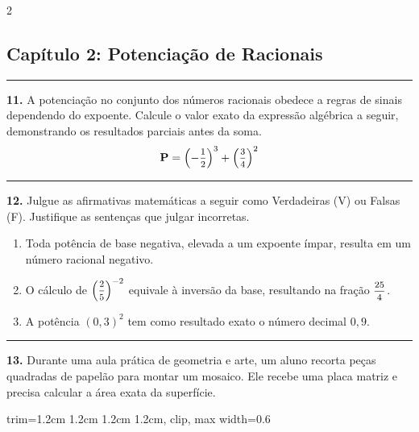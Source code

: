 \documentclass[twoside, 10pt, a4paper]{article}
\newlength{\espacoPosTitulo}\setlength{\espacoPosTitulo}{0.3cm}
\newlength{\espacoPreQuestao}\setlength{\espacoPreQuestao}{0.1cm}
\newlength{\espacoQuestao}\setlength{\espacoQuestao}{0.2cm}
\newcommand{\larguraTikz}{0.85\linewidth}
\begin{document}
\begin{multicols*}{2}
\subsection*{Capítulo 2: Potenciação de Racionais}
\vspace{-0.2cm}\noindent\rule{\linewidth}{1.5pt} 
\par\vspace{\espacoPosTitulo}
\textbf{11.} A potenciação no conjunto dos números racionais obedece a regras de sinais dependendo do expoente. Calcule o valor exato da expressão algébrica a seguir, demonstrando os resultados parciais antes da soma.
$$ \textbf{P} = \left( -\mfrac{1}{2} \right)^{3} + \left( \mfrac{3}{4} \right)^{2} $$
\par\vspace{\espacoQuestao}

\noindent\textcolor{CorLinha}{\rule{\linewidth}{0.5pt}} 
\par\vspace{\espacoPreQuestao}
\textbf{12.} Julgue as afirmativas matemáticas a seguir como Verdadeiras (V) ou Falsas (F). Justifique as sentenças que julgar incorretas.
\begin{enumerate}[label=\Roman*.]
    \item Toda potência de base negativa, elevada a um expoente ímpar, resulta em um número racional negativo.
    \item O cálculo de $ \left( \mfrac{2}{5} \right)^{-2} $ equivale à inversão da base, resultando na fração $ \mfrac{25}{4} $.
    \item A potência $ \left( 0,3 \right)^{2} $ tem como resultado exato o número decimal $ 0,9 $.
\end{enumerate}
\par\vspace{\espacoQuestao}

\noindent\textcolor{CorLinha}{\rule{\linewidth}{0.5pt}} 
\par\vspace{\espacoPreQuestao}
\textbf{13.} Durante uma aula prática de geometria e arte, um aluno recorta peças quadradas de papelão para montar um mosaico. Ele recebe uma placa matriz e precisa calcular a área exata da superfície.
\par\vspace{0.1cm}
\begin{center}
\begin{adjustbox}{trim=1.2cm 1.2cm 1.2cm 1.2cm, clip, max width=0.6\linewidth}
\end{adjustbox}
\end{center}
\end{multicols*}
\end{document}
